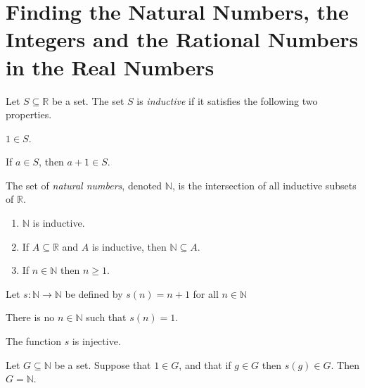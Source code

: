 \section{Finding the Natural Numbers, the Integers and the Rational Numbers in the Real Numbers}
\label{nir}

\begin{definition} %
	Let $S \subseteq \mathbb{R}$ be a set. The set $S$ is \emph{inductive} if it satisfies the following two properties.
	\begin{lenumerate}
		\item $1 \in S$.
		\item If $a \in S$, then $a + 1 \in S$.
	\end{lenumerate}
\end{definition}

\begin{definition} %
	The set of \emph{natural numbers}, denoted $\mathbb{N}$, is the intersection of all inductive subsets of $\mathbb{R}$.
\end{definition}

\begin{lemma} %
	\label{nir:l:ind_n}

	\hfill

	\begin{enumerate}
		\item \label{nir:l:ind_n:1}
		      $\mathbb{N}$ is inductive.
		\item \label{nir:l:ind_n:2}
		      If $A \subseteq \mathbb{R}$ and $A$ is inductive, then $\mathbb{N} \subseteq A$.
		\item \label{nir:l:ind_n:3}
		      If $n \in \mathbb{N}$ then $n \geq 1$.
	\end{enumerate}
\end{lemma}

\begin{theorem} %
	\label{nir:t:peano}
	Let $s: \mathbb{N} \rightarrow \mathbb{N}$ be defined by $s(n) = n + 1$ for all $n \in \mathbb{N}$
	\begin{lenumerate}
		\item \label{nir:t:peano:a}
		      There is no $n \in \mathbb{N}$ such that $s(n) = 1$.
		\item \label{nir:t:peano:b}
		      The function $s$ is injective.
		\item \label{nir:t:peano:c}
		      Let $G \subseteq \mathbb{N}$ be a set. Suppose that $1 \in G$, and that if $g \in G$ then $s(g) \in G$. Then $G = \mathbb{N}$.
	\end{lenumerate}
\end{theorem}

